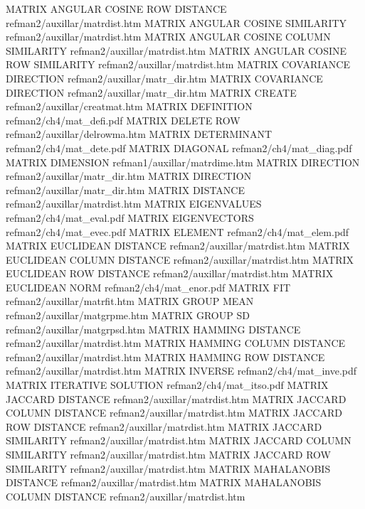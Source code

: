 MATRIX ANGULAR COSINE ROW DISTANCE      refman2/auxillar/matrdist.htm
MATRIX ANGULAR COSINE SIMILARITY        refman2/auxillar/matrdist.htm
MATRIX ANGULAR COSINE COLUMN SIMILARITY refman2/auxillar/matrdist.htm
MATRIX ANGULAR COSINE ROW SIMILARITY    refman2/auxillar/matrdist.htm
MATRIX COVARIANCE DIRECTION             refman2/auxillar/matr_dir.htm
MATRIX COVARIANCE DIRECTION             refman2/auxillar/matr_dir.htm
MATRIX CREATE                           refman2/auxillar/creatmat.htm
MATRIX DEFINITION                       refman2/ch4/mat_defi.pdf
MATRIX DELETE ROW                       refman2/auxillar/delrowma.htm
MATRIX DETERMINANT                      refman2/ch4/mat_dete.pdf
MATRIX DIAGONAL                         refman2/ch4/mat_diag.pdf
MATRIX DIMENSION                        refman1/auxillar/matrdime.htm
MATRIX DIRECTION                        refman2/auxillar/matr_dir.htm
MATRIX DIRECTION                        refman2/auxillar/matr_dir.htm
MATRIX DISTANCE                         refman2/auxillar/matrdist.htm
MATRIX EIGENVALUES                      refman2/ch4/mat_eval.pdf
MATRIX EIGENVECTORS                     refman2/ch4/mat_evec.pdf
MATRIX ELEMENT                          refman2/ch4/mat_elem.pdf
MATRIX EUCLIDEAN DISTANCE               refman2/auxillar/matrdist.htm
MATRIX EUCLIDEAN COLUMN DISTANCE        refman2/auxillar/matrdist.htm
MATRIX EUCLIDEAN ROW DISTANCE           refman2/auxillar/matrdist.htm
MATRIX EUCLIDEAN NORM                   refman2/ch4/mat_enor.pdf
MATRIX FIT                              refman2/auxillar/matrfit.htm
MATRIX GROUP MEAN                       refman2/auxillar/matgrpme.htm
MATRIX GROUP SD                         refman2/auxillar/matgrpsd.htm
MATRIX HAMMING DISTANCE                 refman2/auxillar/matrdist.htm
MATRIX HAMMING COLUMN DISTANCE          refman2/auxillar/matrdist.htm
MATRIX HAMMING ROW DISTANCE             refman2/auxillar/matrdist.htm
MATRIX INVERSE                          refman2/ch4/mat_inve.pdf
MATRIX ITERATIVE SOLUTION               refman2/ch4/mat_itso.pdf
MATRIX JACCARD DISTANCE                 refman2/auxillar/matrdist.htm
MATRIX JACCARD COLUMN DISTANCE          refman2/auxillar/matrdist.htm
MATRIX JACCARD ROW DISTANCE             refman2/auxillar/matrdist.htm
MATRIX JACCARD SIMILARITY               refman2/auxillar/matrdist.htm
MATRIX JACCARD COLUMN SIMILARITY        refman2/auxillar/matrdist.htm
MATRIX JACCARD ROW SIMILARITY           refman2/auxillar/matrdist.htm
MATRIX MAHALANOBIS DISTANCE             refman2/auxillar/matrdist.htm
MATRIX MAHALANOBIS COLUMN DISTANCE      refman2/auxillar/matrdist.htm
